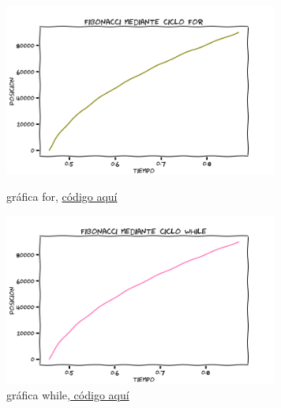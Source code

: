\documentclass{article}
\begin{document}
\begin{figure}[H] 
\begin{minipage}[b]{0.5\linewidth} %
\centering
\includegraphics[width=9cm]{for.png}
\caption{gráfica for, \href{https://github.com/joescalona/Programacion-Astronomica/blob/master/Tarea\%205/Graficas/for.py}{ código aquí}} \label{figura1}
\end{minipage}
\hspace{0.5cm} %
\begin{minipage}[b]{0.5\linewidth}
\centering
\includegraphics[width=9cm]{while.png}
\caption{gráfica while,\href{https://github.com/joescalona/Programacion-Astronomica/blob/master/Tarea\%205/Graficas/whilefib.py}{ código aquí}} \label{figura2}
\end{minipage}
\end{figure}
\end{document}
